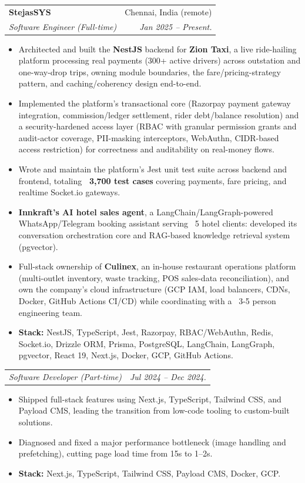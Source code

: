 \documentclass[letterpaper,11pt]{article}
\makeatletter
\newcommand{\resumeItem}[1]{
  \item\small{
    {#1 \vspace{-2pt}}
  }
}
\newcommand{\resumeSubheading}[4]{
  \vspace{-2pt}\item
    \begin{tabular*}{0.97\textwidth}[t]{l@{\extracolsep{\fill}}r}
      \textbf{#1} & #2 \\
      \textit{\small#3} & \textit{\small #4} \\
    \end{tabular*}\vspace{-7pt}
}
\newcommand{\resumeSubSubheading}[2]{
    \item
    \begin{tabular*}{0.97\textwidth}{l@{\extracolsep{\fill}}r}
      \textit{\small#1} & \textit{\small #2} \\
    \end{tabular*}\vspace{-7pt}
}
\newcommand{\resumeItemListStart}{\begin{itemize}}
\newcommand{\resumeItemListEnd}{\end{itemize}\vspace{-5pt}}
\makeatother
\begin{document}
    \resumeSubheading
      {StejasSYS}{Chennai, India (remote)}
      {Software Engineer (Full-time)}{Jan 2025 -- Present.}
      \resumeItemListStart
        \resumeItem{Architected and built the \textbf{NestJS} backend for \textbf{Zion Taxi}, a live ride-hailing platform processing real payments (300+ active drivers) across outstation and one-way-drop trips, owning module boundaries, the fare/pricing-strategy pattern, and caching/coherency design end-to-end.}
        \resumeItem{Implemented the platform's transactional core (Razorpay payment gateway integration, commission/ledger settlement, rider debt/balance resolution) and a security-hardened access layer (RBAC with granular permission grants and audit-actor coverage, PII-masking interceptors, WebAuthn, CIDR-based access restriction) for correctness and auditability on real-money flows.}
        \resumeItem{Wrote and maintain the platform's Jest unit test suite across backend and frontend, totaling \textbf{~3,700 test cases} covering payments, fare pricing, and realtime Socket.io gateways.}
        \resumeItem{\textbf{Innkraft's AI hotel sales agent}, a LangChain/LangGraph-powered WhatsApp/Telegram booking assistant serving ~5 hotel clients: developed its conversation orchestration core and RAG-based knowledge retrieval system (pgvector).}
        \resumeItem{Full-stack ownership of \textbf{Culinex}, an in-house restaurant operations platform (multi-outlet inventory, waste tracking, POS sales-data reconciliation), and own the company's cloud infrastructure (GCP IAM, load balancers, CDNs, Docker, GitHub Actions CI/CD) while coordinating with a ~3-5 person engineering team.}
        \resumeItem{\textbf{Stack:} NestJS, TypeScript, Jest, Razorpay, RBAC/WebAuthn, Redis, Socket.io, Drizzle ORM, Prisma, PostgreSQL, LangChain, LangGraph, pgvector, React 19, Next.js, Docker, GCP, GitHub Actions.}
      \resumeItemListEnd

      \resumeSubSubheading
        {Software Developer (Part-time)}{Jul 2024 -- Dec 2024.}
      \resumeItemListStart
        \resumeItem{Shipped full-stack features using Next.js, TypeScript, Tailwind CSS, and Payload CMS, leading the transition from low-code tooling to custom-built solutions.}
        \resumeItem{Diagnosed and fixed a major performance bottleneck (image handling and prefetching), cutting page load time from 15s to 1--2s.}
        \resumeItem{\textbf{Stack:} Next.js, TypeScript, Tailwind CSS, Payload CMS, Docker, GCP.}
      \resumeItemListEnd
\end{document}
